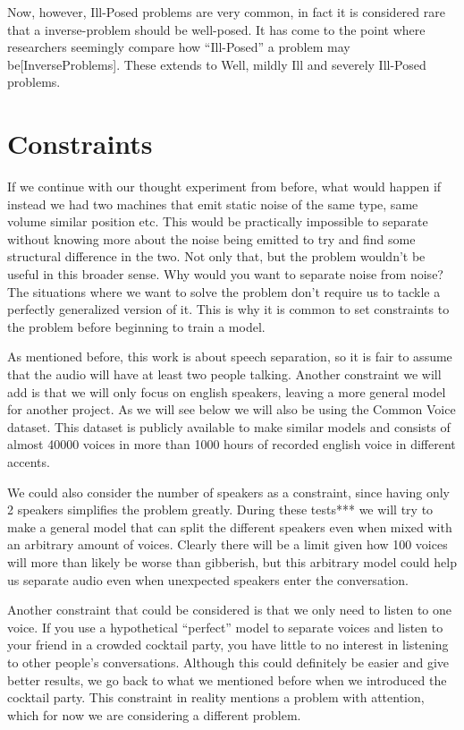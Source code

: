 \documentclass{book}
\begin{document}
    Now, however, Ill-Posed problems are very common, in fact it is considered rare that a inverse-problem should be well-posed. It has come to the point where researchers seemingly compare how “Ill-Posed” a problem may be[InverseProblems]. These extends to Well, mildly Ill and severely Ill-Posed problems.

\section{Constraints}
\qquad If we continue with our thought experiment from before, what would happen if instead we had two machines that emit static noise of the same type, same volume similar position etc. This would be practically impossible to separate without knowing more about the noise being emitted to try and find some structural difference in the two. Not only that, but the problem wouldn’t be useful in this broader sense. Why would you want to separate noise from noise? The situations where we want to solve the problem don’t require us to tackle a perfectly generalized version of it. This is why it is common to set constraints to the problem before beginning to train a model.
\par
As mentioned before, this work is about speech separation, so it is fair to assume that the audio will have at least two people talking. Another constraint we will add is that we will only focus on english speakers, leaving a more general model for another project. As we will see below we will also be using the Common Voice dataset. This dataset is publicly available to make similar models and consists of almost 40000 voices in more than 1000 hours of recorded english voice in different accents.
\par
We could also consider the number of speakers as a constraint, since having only 2 speakers simplifies the problem greatly. During these tests*** we will try to make a general model that can split the different speakers even when mixed with an arbitrary amount of voices. Clearly there will be a limit given how 100 voices will more than likely be worse than gibberish, but this arbitrary model could help us separate audio even when unexpected speakers enter the conversation.
\par
Another constraint that could be considered is that we only need to listen to one voice. If you use a hypothetical “perfect” model to separate voices and listen to your friend in a crowded cocktail party, you have little to no interest in listening to other people's conversations. Although this could definitely be easier and give better results, we go back to what we mentioned before when we introduced the cocktail party. This constraint in reality mentions a problem with attention, which for now we are considering a different problem.




\end{document}
